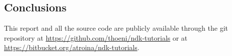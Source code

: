 \documentclass[a4paper,10pt]{article}
\begin{document}
\begin{multicols}{2}
\section{Conclusions}

This report and all the source code are publicly available through the git
repository at \url{https://github.com/thoeni/ndk-tutorials} or at \url{https://bitbucket.org/atroina/ndk-tutorials}.

\nocite{liang1999jni}
\nocite{marakanajni}
\nocite{learningandroid}
\nocite{programmingandroid}




\end{multicols}
\end{document}

